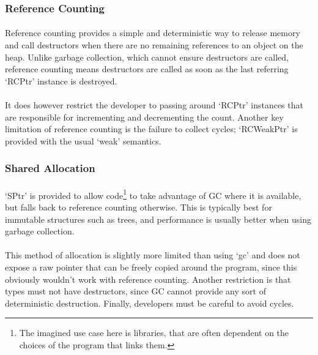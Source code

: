 \documentclass[12pt,twoside,notitlepage]{report}
\begin{document}
\subsubsection{Reference Counting}

\paragraph{}
Reference counting provides a simple and deterministic way to release memory and call destructors when there are no remaining references to an object on the heap. Unlike garbage collection, which cannot ensure destructors are called, reference counting means destructors are called as soon as the last referring `RCPtr' instance is destroyed.

\paragraph{}
It does however restrict the developer to passing around `RCPtr' instances that are responsible for incrementing and decrementing the count. Another key limitation of reference counting is the failure to collect cycles; `RCWeakPtr' is provided with the usual `weak' semantics.

\subsubsection{Shared Allocation}

\paragraph{}
`SPtr' is provided to allow code\footnote{The imagined use case here is libraries, that are often dependent on the choices of the program that links them.} to take advantage of GC where it is available, but falls back to reference counting otherwise. This is typically best for immutable structures such as trees, and performance is usually better when using garbage collection.

\paragraph{}
This method of allocation is slightly more limited than using `gc' and does not expose a raw pointer that can be freely copied around the program, since this obviously wouldn't work with reference counting. Another restriction is that types must not have destructors, since GC cannot provide any sort of deterministic destruction. Finally, developers must be careful to avoid cycles.
\end{document}
